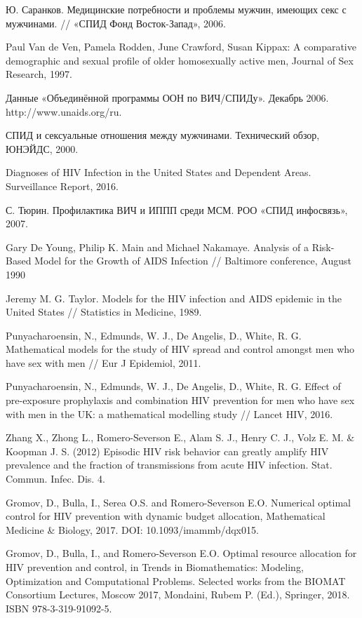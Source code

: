\documentclass[a4paper]{report}
\begin{document}
\begin{thebibliography}{99}
		 Ю. Саранков. Медицинские потребности и проблемы мужчин, имеющих секс с мужчинами. // «СПИД Фонд Восток-Запад», 2006.
		
		Paul Van de Ven, Pamela Rodden, June Crawford, Susan Kippax: A comparative demographic and sexual profile of older homosexually active men, Journal of Sex Research, 1997.
		
		Данные «Объединённой программы ООН по ВИЧ/СПИДу». Декабрь 2006. http://www.unaids.org/ru.
		
		СПИД и сексуальные отношения между мужчинами. Технический обзор, ЮНЭЙДС, 2000.
		
		Diagnoses of HIV Infection in the United States and Dependent Areas. Surveillance Report, 2016.
		
		С. Тюрин. Профилактика ВИЧ и ИППП среди МСМ. РОО «СПИД инфосвязь», 2007.

		Gary De Young, Philip K. Main and Michael Nakamaye. Analysis of a Risk-Based Model for the Growth of AIDS Infection // Baltimore conference, August 1990
		
		Jeremy M. G. Taylor. Models for the HIV infection and AIDS epidemic in the United States // Statistics in Medicine, 1989.
		
		Punyacharoensin, N., Edmunds, W. J., De Angelis, D., White, R. G. Mathematical models for the study of HIV spread and control amongst men who have sex with men //
		Eur J Epidemiol, 2011.	
		
		Punyacharoensin, N., Edmunds, W. J., De Angelis, D., White, R. G. Effect of pre-exposure prophylaxis and combination HIV prevention for men who have sex with men in the UK: a mathematical modelling study //  Lancet HIV, 2016.
		
		Zhang X., Zhong L., Romero-Severson E., Alam S. J., Henry C. J., Volz E. M. \& Koopman J. S. (2012) Episodic HIV risk behavior can greatly amplify HIV prevalence and the fraction of transmissions from acute HIV infection. Stat. Commun. Infec. Dis. 4.
		
		Gromov, D., Bulla, I., Serea O.S. and Romero-Severson E.O. Numerical optimal control for HIV prevention with dynamic budget allocation, Mathematical Medicine \& Biology, 2017.
		DOI: 10.1093/imammb/dqx015.
		
		Gromov, D., Bulla, I., and Romero-Severson E.O. Optimal resource allocation for HIV prevention and control, in Trends in Biomathematics: Modeling, Optimization and Computational Problems. Selected works from the BIOMAT Consortium Lectures, Moscow 2017, Mondaini, Rubem P. (Ed.), Springer, 2018. ISBN 978-3-319-91092-5.
		

\end{thebibliography}
\end{document}
